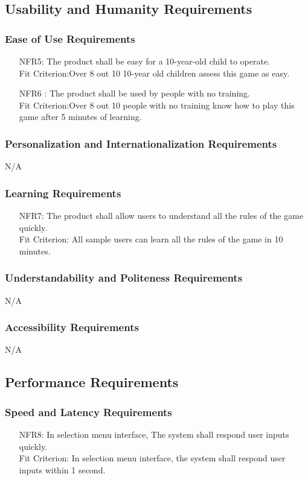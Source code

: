 \documentclass[12pt]{article}
\begin{document}
\subsection{Usability and Humanity Requirements}
\subsubsection{Ease of Use Requirements}
\begin{itemize}
\item[NFR5:]The product shall be easy for a 10-year-old child to operate.\\
Fit Criterion:Over 8 out 10 10-year old children assess this game as easy.
\item[NFR6]: The product shall be used by people with no training.\\
Fit Criterion:Over 8 out 10 people with no training know how to play this game after 5 minutes of learning.
\end{itemize}
\subsubsection{Personalization and Internationalization Requirements}
N/A
\subsubsection{Learning Requirements}
\begin{itemize}
\item[NFR7:] The product shall allow users to understand all the rules of the game quickly.\\
Fit Criterion: All sample users can learn all the rules of the game in 10 minutes.
\end{itemize}
\subsubsection{Understandability and Politeness Requirements}
N/A
\subsubsection{Accessibility Requirements}
N/A
\subsection{Performance Requirements}
\subsubsection{Speed and Latency Requirements}
\begin{itemize}
\item[NFR8:] In selection menu interface, The system shall respond user inputs quickly.\\
Fit Criterion: In selection menu interface, the system shall respond user inputs within 1 second.
\end{itemize}
\end{document}
